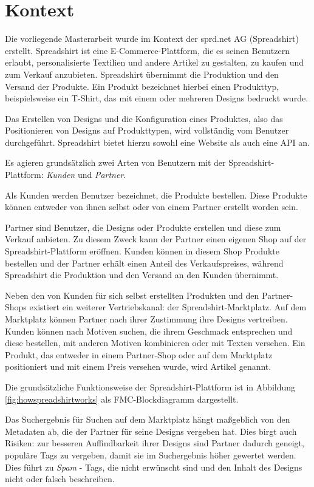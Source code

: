 \section{Kontext}   
\label{spreadshirt}

Die vorliegende Masterarbeit wurde im Kontext der sprd.net AG (Spreadshirt) \cite{sprd2013} erstellt. Spreadshirt ist eine E-Commerce-Plattform, die es seinen Benutzern erlaubt, personalisierte Textilien und andere Artikel zu gestalten, zu kaufen und zum Verkauf anzubieten. Spreadshirt übernimmt die Produktion und den Versand der Produkte. Ein Produkt bezeichnet hierbei einen Produkttyp, beispielsweise ein T-Shirt, das mit einem oder mehreren Designs bedruckt wurde.

Das Erstellen von Designs und die Konfiguration eines Produktes, also das Positionieren von Designs auf Produkttypen, wird vollständig vom Benutzer durchgeführt. Spreadshirt bietet hierzu sowohl eine Website als auch eine API an.

Es agieren grundsätzlich zwei Arten von Benutzern mit der Spreadshirt-Plattform: \emph{Kunden} und \emph{Partner}.

Als Kunden werden Benutzer bezeichnet, die Produkte bestellen. Diese Produkte können entweder von ihnen selbst oder von einem Partner erstellt worden sein. 

Partner sind Benutzer, die Designs oder Produkte erstellen und diese zum Verkauf anbieten. Zu diesem Zweck kann der Partner einen eigenen Shop auf der Spreadshirt-Plattform eröffnen. Kunden können in diesem Shop Produkte bestellen und der Partner erhält einen Anteil des Verkaufspreises, während Spreadshirt die Produktion und den Versand an den Kunden übernimmt.

Neben den von Kunden für sich selbst erstellten Produkten und den Partner-Shops existiert ein weiterer Vertriebskanal: der Spreadshirt-Marktplatz. Auf dem Marktplatz können Partner nach ihrer Zustimmung ihre Designs vertreiben. Kunden können nach Motiven suchen, die ihrem Geschmack entsprechen und diese bestellen, mit anderen Motiven kombinieren oder mit Texten versehen. Ein Produkt, das entweder in einem Partner-Shop oder auf dem Marktplatz positioniert und mit einem Preis versehen wurde, wird Artikel genannt.

Die grundsätzliche Funktionsweise der Spreadshirt-Plattform ist in Abbildung \ref{fig:howspreadshirtworks} als FMC-Blockdiagramm dargestellt.

Das Suchergebnis für Suchen auf dem Marktplatz hängt maßgeblich von den Metadaten ab, die der Partner für seine Designs vergeben hat. Dies birgt auch Risiken: zur besseren Auffindbarkeit ihrer Designs sind Partner dadurch geneigt, populäre Tags zu vergeben, damit sie im Suchergebnis höher gewertet werden. Dies führt zu \emph{Spam} - Tags, die nicht erwünscht sind und den Inhalt des Designs nicht oder falsch beschreiben.

